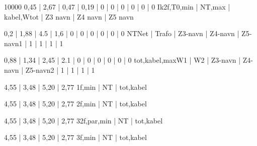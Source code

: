 \documentclass[a4paper,oneside,10pt,danish]{report}
\begin{document}
\begin{HV-ZtilIk3f}{10000}{ 0,45 | 2,67 | 0,47 | 0,19 | 0 | 0 | 0 | 0 | 0 | 0 }{Ik2f,T0,min | NT,max | kabel,Wtot | Z3 navn | Z4 navn | Z5 navn}
\end{HV-ZtilIk3f}

\begin{Ztotal}{ 0,2 | 1,88 | 4.5 | 1,6 | 0 | 0 | 0 | 0 | 0 | 0 }{NT}{Net | Trafo | Z3-navn | Z4-navn | Z5-navn}{1 | 1 | 1 | 1 | 1}
\end{Ztotal}

\begin{LV-Ztotal-max}{ 0,88 | 1,34 | 2,45 | 2.1 | 0 | 0 | 0 | 0 | 0 | 0 }{tot,kabel,max}{W1 | W2 | Z3-navn | Z4-navn | Z5-navn}{2 | 1 | 1 | 1 | 1}
\end{LV-Ztotal-max}

\begin{LV-Ik1f-kA}{ 4,55 | 3,48 | 5,20 | 2,77 }{1f,min | NT | tot,kabel}
\end{LV-Ik1f-kA}

\begin{LV-Ik2f-kA}{ 4,55 | 3,48 | 5,20 | 2,77 }{2f,min | NT | tot,kabel}
\end{LV-Ik2f-kA}

\begin{LV-Ik2f,parSikr-kA}{ 4,55 | 3,48 | 5,20 | 2,77 }{3}{2f,par,min | NT | tot,kabel}
\end{LV-Ik2f,parSikr-kA}

\begin{LV-Ik3f-kA}{ 4,55 | 3,48 | 5,20 | 2,77 }{3f,min | NT | tot,kabel}
\end{LV-Ik3f-kA}
\end{document}
